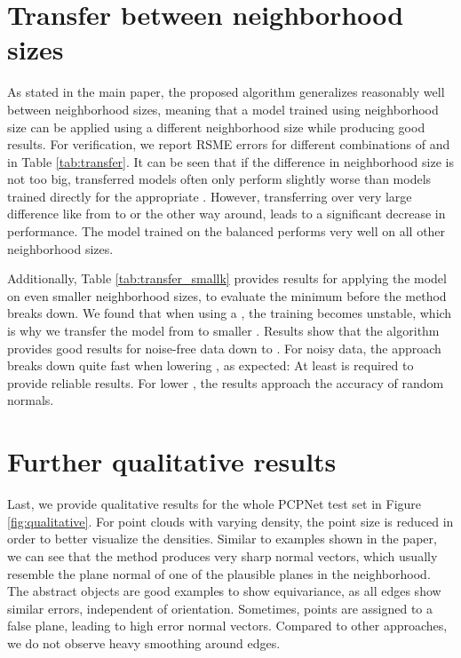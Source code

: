 \documentclass[10pt,twocolumn,letterpaper]{article}
\begin{document}
\section{Transfer between neighborhood sizes}
\label{sec:transfer}
As stated in the main paper, the proposed algorithm generalizes reasonably well between neighborhood sizes, meaning that a model trained using neighborhood size  can be applied using a different neighborhood size  while producing good results. For verification, we report RSME errors for different combinations of  and  in Table \ref{tab:transfer}. It can be seen that if the difference in neighborhood size is not too big, transferred models often only perform slightly worse than models trained directly for the appropriate . However, transferring over very large difference like from  to  or the other way around, leads to a significant decrease in performance. The model trained on the balanced  performs very well on all other neighborhood sizes.



Additionally, Table \ref{tab:transfer_smallk} provides results for applying the model on even smaller neighborhood sizes, to evaluate the minimum  before the method breaks down. We found that when using a , the training becomes unstable, which is why we transfer the model from  to smaller . Results show that the algorithm provides good results for noise-free data down to . For noisy data, the approach breaks down quite fast when lowering , as expected: At least  is required to provide reliable results. For lower , the results approach the accuracy of random normals.

\section{Further qualitative results}
\label{sec:qualitative}
\vspace{-0.1cm}
Last, we provide qualitative results for the whole PCPNet test set in Figure \ref{fig:qualitative}. For point clouds with varying density, the point size is reduced in order to better visualize the densities. Similar to examples shown in the paper, we can see that the method produces very sharp normal vectors, which usually resemble the plane normal of one of the plausible planes in the neighborhood. The abstract objects are good examples to show equivariance, as all edges show similar errors, independent of orientation. Sometimes, points are assigned to a false plane, leading to high error normal vectors. Compared to other approaches, we do not observe heavy smoothing around edges.
\end{document}
